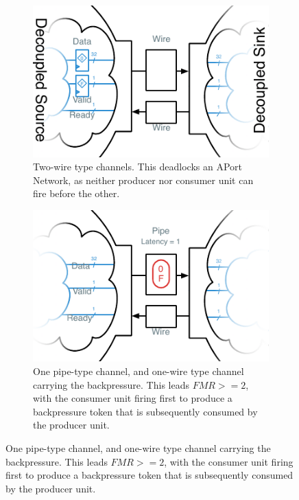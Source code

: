 \begin{figure}
    \centering
    \begin{subfigure}[t]{0.49\textwidth}
        \captionsetup{margin=0.25cm}
        \includegraphics[width=\columnwidth]{figures/li-wire-channel-manual.pdf}
        \caption{Two-wire type channels. This deadlocks an APort Network, as neither producer nor consumer unit can fire
        before the other.}
    \end{subfigure}
    \begin{subfigure}[t]{0.49\textwidth}
        \captionsetup{margin=0.25cm}
        \includegraphics[width=\columnwidth]{figures/li-pipe-channel-manual.pdf}
        \caption{One pipe-type channel, and one-wire type channel carrying the backpressure. This leads $FMR >= 2$, with the consumer unit
        firing first to produce a backpressure token that is subsequently consumed by the producer unit.}

\end{subfigure}
\end{figure}
